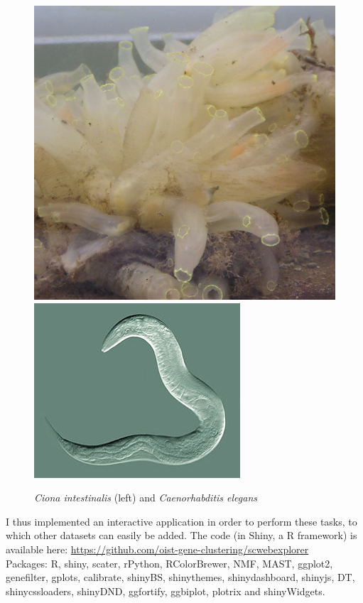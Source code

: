 \documentclass{report}
\begin{document}
\begin{figure}[H]
\caption{\textit{Ciona intestinalis} (left) and \textit{Caenorhabditis elegans}}
\centering
\subfigure\includegraphics[scale=0.1]{illustrations/ciona.jpg}
\subfigure\includegraphics[scale=0.5]{illustrations/celegans.jpg}
\end{figure}

I thus implemented an interactive application in order to perform these tasks, to which other datasets can easily be added. The code (in Shiny, a R framework) is available here: {\url{https://github.com/oist-gene-clustering/scwebexplorer}}\\ 

Packages: R\cite{baser}, shiny\cite{shinyr}, scater\cite{scaterr}, rPython\cite{rpythonr}, RColorBrewer\cite{rcolorbrewerr}, NMF\cite{nmfr}, MAST\cite{mastr}, ggplot2\cite{ggplot2r}, genefilter\cite{genefilterr}, gplots\cite{gplotsr}, calibrate\cite{calibrater}, shinyBS\cite{shinybsr}, shinythemes\cite{shinythemesr}, shinydashboard\cite{shinydashboardr}, shinyjs\cite{shinyjsr}, DT\cite{dtr}, shinycssloaders\cite{shinycssloadersr}, shinyDND\cite{shinydndr}, ggfortify\cite{ggfortifyr}, ggbiplot\cite{ggbiplotr}, plotrix\cite{plotrixr} and shinyWidgets\cite{shinywidgetsr}.\\
\end{document}

